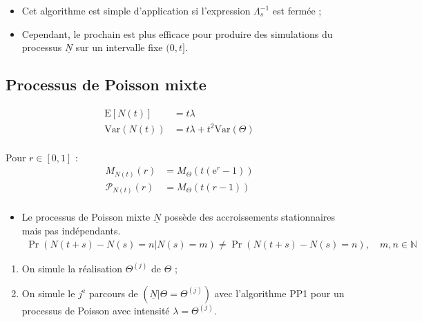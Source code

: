 \documentclass[10pt, french]{article}
\begin{document}
\begin{multicols*}{2}
\begin{algo2}
\begin{itemize}
	\item	Cet algorithme est simple d'application si l'expression $\Lambda_{s}^{-1}$ est fermée ;
	\item	Cependant, le prochain est plus efficace pour produire des simulations du processus $\underline{N}$ sur un intervalle fixe $(0, t]$.
\end{itemize}
\end{algo2}


\columnbreak
\subsection{Processus de Poisson mixte}
\begin{align*}
	\text{E}[N(t)]
	&=	t\lambda	\\
	\text{Var}(N(t))
	&=	t\lambda	 + t^{2}\text{Var}(\Theta)\\
\end{align*}

Pour $r \in [0, 1]$ :
\begin{align*}
	M_{N(t)}(r)
	&=	M_{\Theta}\left( t(\textrm{e}^{r} - 1)\right)	\\
	\mathcal{P}_{N(t)}(r)
	&=	M_{\Theta}\left( t(r - 1)\right)	\\
\end{align*}

\begin{itemize}
	\item	Le processus de Poisson mixte $\underline{N}$ possède des accroissements stationnaires mais pas indépendants.
		\begin{align*}
		\Pr\left(N(t + s) - N(s) = n | N(s) = m\right)
		\neq		\Pr\left(N(t + s)	-	N(s)	=	n\right), \quad m, n \in \mathbb{N}
		\end{align*}
\end{itemize}

\begin{algo2}
\begin{enumerate}
	\item	On simule la réalisation $\Theta^{(j)}$ de $\Theta$ ;
	\item	On simule le $j^{\text{e}}$ parcours de $(\underline{N} | \Theta = \Theta^{(j)})$ avec l'algorithme PP1 pour un processus de Poisson avec intensité $\lambda = \Theta^{(j)}$.
\end{enumerate}
\end{algo2}



\end{multicols*}
\end{document}
